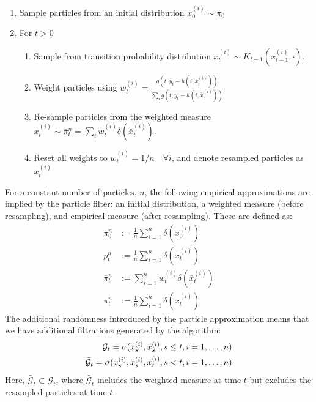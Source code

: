 \begin{enumerate}
	\item Sample particles from an initial distribution $x_0^{(i)} \sim \pi_0$
	\item For $t > 0$
		\begin{enumerate}
			\item Sample from transition probability distribution $\bar{x}_t^{(i)} \sim K_{t-1}(x_{t-1}^{(i)}, \cdot)$.
			\item Weight particles using $w_t^{(i)} = \frac{ g(t, y_t - h(i, \bar{x}_t^{(i)})) }{\sum_i g(t, y_t - h(i, \bar{x}_t^{(i)}))}$
			\item Re-sample particles from the weighted measure  $x_t^{(i)} \sim \bar{\pi}_t^n = \sum_{i} w_t^{(i)} \delta(\bar{x}_t^{(i)})$.
			\item Reset all weights to  $w_t^{(i)} = 1/n \quad \forall i$, and denote resampled particles as $x_{t}^{(i)}$
		\end{enumerate}
\end{enumerate} For a constant number of particles, $n$, the following empirical approximations are implied by the particle filter: an initial distribution, a weighted measure (before resampling), and empirical measure (after resampling). These are defined as:
\begin{align}
\pi_0^n &:= \frac{1}{n}\sum_{i=1}^n \delta(x_0^{(i)}) \\
p_t^n &:= \frac{1}{n}\sum_{i=1}^n \delta(\bar{x}_t^{(i)}) \\
\bar{\pi}_t^n &:= \sum_{i=1}^n w_t^{(i)} \delta(\bar{x}_t^{(i)}) \\
\pi_t^n &:= \frac{1}{n}\sum_{i=1}^n \delta(x_t^{(i)}) 
\end{align}
The additional randomness introduced by the particle approximation means that we have additional filtrations generated by the algorithm:
\begin{align}
\mathcal{G}_t = \sigma(x_s^{(i)}, \bar{x}_s^{(i)}, s \leq t, i = 1, \hdots, n) \\
\bar{\mathcal{G}}_t = \sigma(x_s^{(i)}, \bar{x}_s^{(i)}, \bar{x}_t^{(i)}, s < t, i = 1, \hdots, n)
\end{align} Here, $\bar{\mathcal{G}}_t \subset \mathcal{G}_t$, where $\bar{\mathcal{G}}_t $ includes the weighted measure at time $t$ but excludes the resampled particles at time $t$. 

